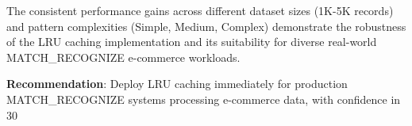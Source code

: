\documentclass{article}
\begin{document}
The consistent performance gains across different dataset sizes (1K-5K records) and pattern complexities (Simple, Medium, Complex) demonstrate the robustness of the LRU caching implementation and its suitability for diverse real-world MATCH\_RECOGNIZE e-commerce workloads.

\textbf{Recommendation}: Deploy LRU caching immediately for production MATCH\_RECOGNIZE systems processing e-commerce data, with confidence in 30%
\end{document}
